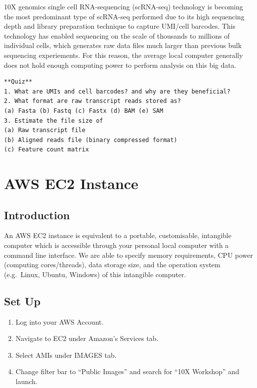 \documentclass[]{book}
\begin{document}
10X genomics single cell RNA-sequencing (scRNA-seq) technology is becoming the most predominant type of scRNA-seq performed due to its high sequencing depth and library preparation technique to capture UMI/cell barcodes. This technology has enabled sequencing on the scale of thousands to millions of individual cells, which generates raw data files much larger than previous bulk sequencing experiements. For this reason, the average local computer generally does not hold enough computing power to perform analysis on this big data.

\begin{verbatim}
**Quiz**
1. What are UMIs and cell barcodes? and why are they beneficial?
2. What format are raw transcript reads stored as? 
(a) Fasta (b) Fastq (c) Fastx (d) BAM (e) SAM
3. Estimate the file size of 
(a) Raw transcript file
(b) Aligned reads file (binary compressed format)
(c) Feature count matrix
\end{verbatim}

\hypertarget{aws-ec2-instance}{%
\chapter{AWS EC2 Instance}\label{aws-ec2-instance}}

\hypertarget{introduction}{%
\section{Introduction}\label{introduction}}

An AWS EC2 instance is equivalent to a portable, customisable, intangible computer which is accessible through your personal local computer with a command line interface. We are able to specify memory requirements, CPU power (computing cores/threads), data storage size, and the operation system (e.g.~Linux, Ubuntu, Windows) of this intangible computer.

\hypertarget{set-up}{%
\section{Set Up}\label{set-up}}

\begin{enumerate}
\def\labelenumi{\arabic{enumi}.}
\item
  Log into your AWS Account.
\item
  Navigate to EC2 under Amazon's Services tab.
\item
  Select AMIs under IMAGES tab.
\item
  Change filter bar to ``Public Images'' and search for ``10X Workshop'' and launch.
\end{enumerate}
\end{document}

